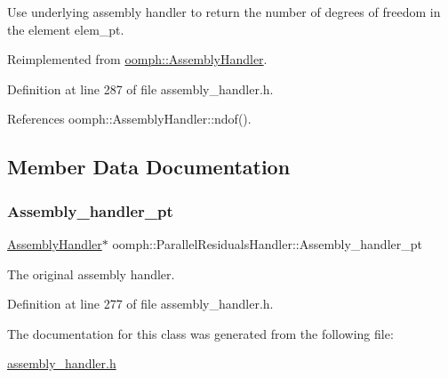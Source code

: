 Use underlying assembly handler to return the number of degrees of freedom in the element elem\+\_\+pt. 



Reimplemented from \hyperlink{classoomph_1_1AssemblyHandler_a09213be8f4aa009e0366460a7ed78e68}{oomph\+::\+Assembly\+Handler}.



Definition at line 287 of file assembly\+\_\+handler.\+h.



References oomph\+::\+Assembly\+Handler\+::ndof().



\subsection{Member Data Documentation}
\mbox{\label{classoomph_1_1ParallelResidualsHandler_a39fa02ec4efbb5f23df78a593d116672}} 
\subsubsection{\texorpdfstring{Assembly\+\_\+handler\+\_\+pt}{Assembly\_handler\_pt}}
{\footnotesize\ttfamily \hyperlink{classoomph_1_1AssemblyHandler}{Assembly\+Handler}$\ast$ oomph\+::\+Parallel\+Residuals\+Handler\+::\+Assembly\+\_\+handler\+\_\+pt\hspace{0.3cm}{\ttfamily [private]}}



The original assembly handler. 



Definition at line 277 of file assembly\+\_\+handler.\+h.



The documentation for this class was generated from the following file\+:\begin{DoxyCompactItemize}
\item 
\hyperlink{assembly__handler_8h}{assembly\+\_\+handler.\+h}\end{DoxyCompactItemize}

